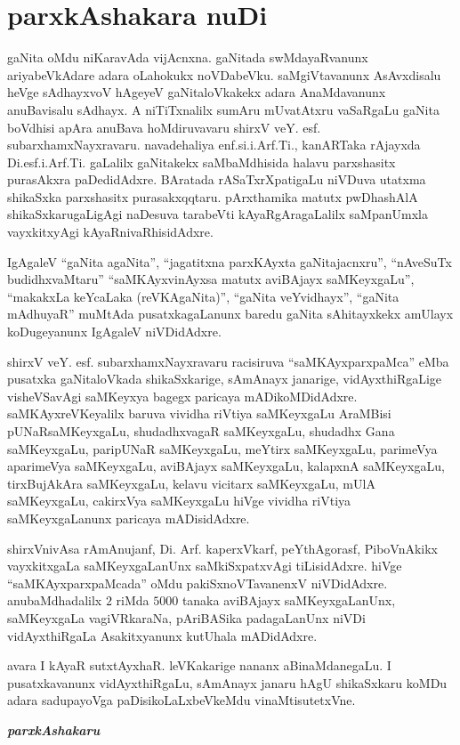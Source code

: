 \chapter*{parxkAshakara nuDi}
\vskip -10pt

gaNita oMdu niKaravAda vijAcnxna. gaNitada swMdayaRvanunx ariyabeVkAdare adara oLahokukx noVDabeVku. saMgiVtavanunx AsAvxdisalu heVge sAdhayxvoV hAgeyeV gaNitaloVkakekx adara AnaMdavanunx anuBavisalu sAdhayx. A niTiTxnalilx sumAru mUvatAtxru vaSaRgaLu gaNita boVdhisi apAra anuBava hoMdiruvavaru shirxV veY. esf. subarxhamxNayxravaru. navadehaliya enf.si.i.Arf.Ti., kanARTaka rAjayxda Di.esf.i.Arf.Ti. gaLalilx gaNitakekx saMbaMdhisida halavu parxshasitx purasAkxra paDedidAdxre. BAratada rASaTxrXpatigaLu niVDuva utatxma shikaSxka parxshasitx purasakxqqtaru. pArxthamika matutx pwDhashAlA shikaSxkarugaLigAgi naDesuva tarabeVti kAyaRgAragaLalilx saMpanUmxla vayxkitxyAgi kAyaRnivaRhisidAdxre.

IgAgaleV ``gaNita agaNita'', ``jagatitxna parxKAyxta gaNitajacnxru'', ``nAveSuTx budidhxvaMtaru'' ``saMKAyxvinAyxsa matutx aviBAjayx saMKeyxgaLu'', ``makakxLa keYcaLaka (reVKAgaNita)'', ``gaNita veYvidhayx'', ``gaNita mAdhuyaR'' muMtAda pusatxkagaLanunx baredu gaNita sAhitayxkekx amUlayx koDugeyanunx IgAgaleV niVDidAdxre.

shirxV veY. esf. subarxhamxNayxravaru racisiruva ``saMKAyxparxpaMca'' eMba pusatxka gaNitaloVkada shikaSxkarige, sAmAnayx janarige, vidAyxthiRgaLige visheVSavAgi saMKeyxya bagegx paricaya mADikoMDidAdxre. saMKAyxreVKeyalilx baruva vividha riVtiya saMKeyxgaLu AraMBisi pUNaRsaMKeyxgaLu, shudadhxvagaR saMKeyxgaLu, shudadhx Gana saMKeyxgaLu, paripUNaR saMKeyxgaLu, meYtirx saMKeyxgaLu, parimeVya aparimeVya saMKeyxgaLu, aviBAjayx saMKeyxgaLu, kalapxnA saMKeyxgaLu, tirxBujAkAra saMKeyxgaLu, kelavu vicitarx saMKeyxgaLu, mUlA saMKeyxgaLu, cakirxVya saMKeyxgaLu hiVge vividha riVtiya saMKeyxgaLanunx paricaya mADisidAdxre.

shirxVnivAsa rAmAnujanf, Di. Arf. kaperxVkarf, peYthAgorasf, PiboVnAkikx vayxkitxgaLa saMKeyxgaLanUnx saMkiSxpatxvAgi tiLisidAdxre. hiVge ``saMKAyxparxpaMcada'' oMdu pakiSxnoVTavanenxV niVDidAdxre. anubaMdhadalilx $2$ riMda $5000$ tanaka aviBAjayx saMKeyxgaLanUnx, saMKeyxgaLa vagiVRkaraNa, pAriBASika padagaLanUnx niVDi vidAyxthiRgaLa Asakitxyanunx kutUhala mADidAdxre.

avara I kAyaR sutxtAyxhaR. leVKakarige nananx aBinaMdanegaLu. I pusatxkavanunx vidAyxthiRgaLu, sAmAnayx janaru hAgU shikaSxkaru koMDu adara sadupayoVga paDisikoLaLxbeVkeMdu vinaMtisutetxVne.

\bigskip
\medskip

\hfill {\bf\slshape parxkAshakaru}


